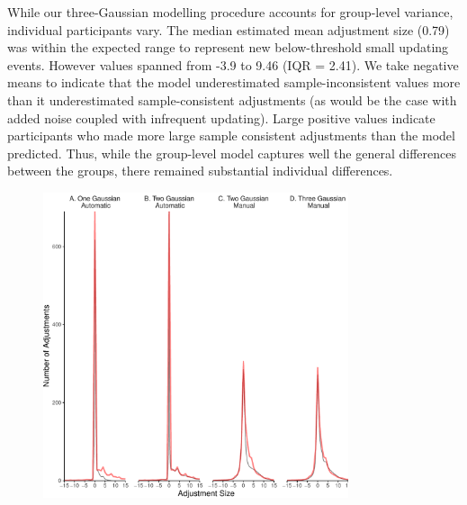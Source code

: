 \documentclass[sn-apa]{sn-jnl}\usepackage[]{graphicx}\usepackage[]{xcolor}
\newenvironment{knitrout}{}{} %
\begin{document}
While our three-Gaussian modelling procedure accounts for group-level variance, individual participants vary. The median estimated mean adjustment size (0.79) was within the expected range to represent new below-threshold small updating events. However values spanned from -3.9 to 9.46 (IQR = 2.41). We take negative means to indicate that the model underestimated sample-inconsistent values more than it underestimated sample-consistent adjustments (as would be the case with added noise coupled with infrequent updating). Large positive values indicate participants who made more large sample consistent adjustments than the model predicted. Thus, while the group-level model captures well the general differences between the groups, there remained substantial individual differences.


\begin{figure}[htp]
\centering
\begin{knitrout}
\color{fgcolor}
\includegraphics[width=0.8\textwidth]{figure/unnamed-chunk-12-1} 
\end{knitrout}


\end{figure}
\end{document}
